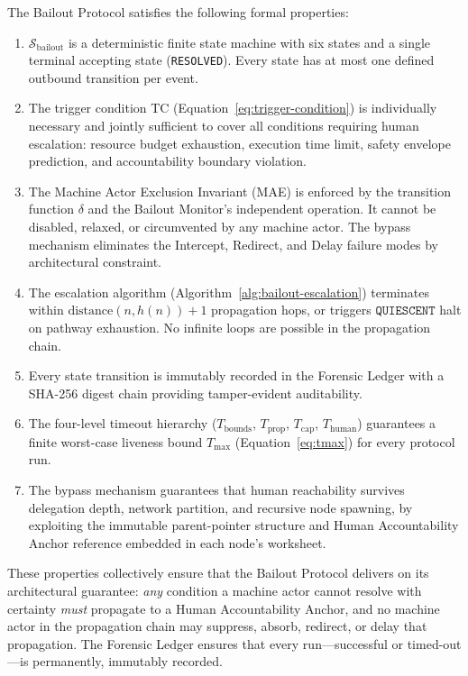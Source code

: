 The Bailout Protocol satisfies the following formal properties:

\begin{enumerate}\itemsep=0pt
\item $\mathcal{S}_{\text{bailout}}$ is a deterministic finite state machine
  with six states and a single terminal accepting state (\texttt{RESOLVED}).
  Every state has at most one defined outbound transition per event.

\item The trigger condition TC (Equation~\ref{eq:trigger-condition}) is
  individually necessary and jointly sufficient to cover all conditions
  requiring human escalation: resource budget exhaustion, execution time
  limit, safety envelope prediction, and accountability boundary violation.

\item The Machine Actor Exclusion Invariant (MAE) is enforced by the
  transition function $\delta$ and the Bailout Monitor's independent
  operation. It cannot be disabled, relaxed, or circumvented by any
  machine actor. The bypass mechanism eliminates the Intercept, Redirect,
  and Delay failure modes by architectural constraint.

\item The escalation algorithm (Algorithm~\ref{alg:bailout-escalation})
  terminates within $\text{distance}(n, h(n)) + 1$ propagation hops, or
  triggers $\texttt{QUIESCENT}$ halt on pathway exhaustion. No infinite
  loops are possible in the propagation chain.

\item Every state transition is immutably recorded in the Forensic Ledger
  with a SHA-256 digest chain providing tamper-evident auditability.

\item The four-level timeout hierarchy
  ($T_{\text{bounds}}$, $T_{\text{prop}}$, $T_{\text{cap}}$,
  $T_{\text{human}}$) guarantees a finite worst-case liveness bound
  $T_{\max}$ (Equation~\ref{eq:tmax}) for every protocol run.

\item The bypass mechanism guarantees that human reachability survives
  delegation depth, network partition, and recursive node spawning, by
  exploiting the immutable parent-pointer structure and Human Accountability
  Anchor reference embedded in each node's worksheet.
\end{enumerate}

These properties collectively ensure that the Bailout Protocol delivers on
its architectural guarantee: \emph{any} condition a machine actor cannot
resolve with certainty \emph{must} propagate to a Human Accountability
Anchor, and no machine actor in the propagation chain may suppress,
absorb, redirect, or delay that propagation. The Forensic Ledger ensures
that every run—successful or timed-out—is permanently, immutably recorded.
